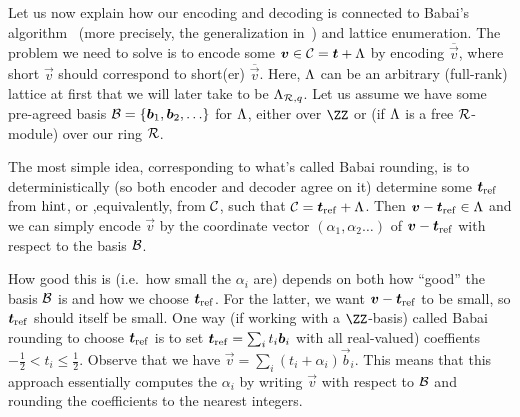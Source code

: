 \begin{remark}\label{rmk:RelationshipToBabai}
Let us now explain how our encoding and decoding is connected to Babai's algorithm~\cite{DBLP:journals/combinatorica/Babai86} (more precisely, the generalization in~\cite{RSA:LinPei11}) and lattice enumeration.
The problem we need to solve is to encode some $\boldsymbol{v}\in\mathcal{C} = \boldsymbol{t} + \Lambda$ by encoding $\overline{\vec{v}}$, where short $\vec{v}$ should correspond to short(er) $\overline{\vec{v}}$. Here, $\Lambda$ can be an arbitrary (full-rank) lattice at first that we will later take to be $\Lambda_{\mathcal{R},q}$. Let us assume we have some pre-agreed basis $\mathcal{B} = \{\boldsymbol{b}_1,\boldsymbol{b}_2,\ldots\}$ for $\Lambda$, either over $\ZZ$ or (if $\Lambda$ is a free $\mathcal{R}$-module) over our ring $\mathcal{R}$.

The most simple idea, corresponding to what's called Babai rounding, is to deterministically (so both encoder and decoder agree on it) determine some $\boldsymbol{t}_{\mathrm{ref}}$ from $\mathrm{hint}$, or ,equivalently, from $\mathcal{C}$, such that $\mathcal{C} = \boldsymbol{t}_{\mathrm{ref}} + \Lambda$. Then $\boldsymbol{v} - \boldsymbol{t}_{\mathrm{ref}} \in \Lambda$ and we can simply encode $\vec{v}$ by the coordinate vector $(\alpha_1,\alpha_2\ldots)$ of $\boldsymbol{v}-\boldsymbol{t}_{\mathrm{ref}}$ with respect to the basis $\mathcal{B}$.

How good this is (i.e.\ how small the $\alpha_i$ are) depends on both how ``good'' the basis $\mathcal{B}$ is and how we choose $\boldsymbol{t}_{\mathrm{ref}}$. For the latter, we want $\boldsymbol{v}-\boldsymbol{t}_{\mathrm{ref}}$ to be small, so $\boldsymbol{t}_{\mathrm{ref}}$ should itself be small. One way (if working with a $\ZZ$-basis) called Babai rounding to choose $\boldsymbol{t}_{\mathrm{ref}}$ is to set $\boldsymbol{t}_{\mathrm{ref}} = \sum_i  t_i\boldsymbol{b}_i$ with all real-valued) coeffients $-\tfrac12 < t_i \leq \tfrac12$. Observe that we have $\vec{v} = \sum_i (t_i + \alpha_i)\vec{b}_i$.
This means that this approach essentially computes the $\alpha_i$ by writing $\vec{v}$ with respect to $\mathcal{B}$ and rounding the coefficients to the nearest integers.


\end{remark}
